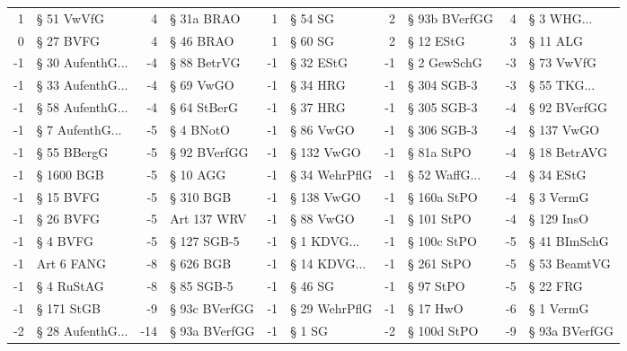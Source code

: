 \begin{tabular}{rlrlrlrlrl}
         1 &         § 51 VwVfG &          4 &    § 31a BRAO &           1 &        § 54 SG &          2 &   § 93b BVerfGG &          4 &  § 3 WHG... \\
         0 &          § 27 BVFG &          4 &     § 46 BRAO &           1 &        § 60 SG &          2 &       § 12 EStG &          3 &      § 11 ALG \\
        -1 & § 30 AufenthG... &         -4 &   § 88 BetrVG &          -1 &      § 32 EStG &         -1 &     § 2 GewSchG &         -3 &    § 73 VwVfG \\
        -1 & § 33 AufenthG... &         -4 &     § 69 VwGO &          -1 &       § 34 HRG &         -1 &     § 304 SGB-3 &         -3 & § 55 TKG... \\
        -1 & § 58 AufenthG... &         -4 &   § 64 StBerG &          -1 &       § 37 HRG &         -1 &     § 305 SGB-3 &         -4 &  § 92 BVerfGG \\
        -1 &  § 7 AufenthG... &         -5 &     § 4 BNotO &          -1 &      § 86 VwGO &         -1 &     § 306 SGB-3 &         -4 &    § 137 VwGO \\
        -1 &        § 55 BBergG &         -5 &  § 92 BVerfGG &          -1 &     § 132 VwGO &         -1 &      § 81a StPO &         -4 &  § 18 BetrAVG \\
        -1 &         § 1600 BGB &         -5 &      § 10 AGG &          -1 &  § 34 WehrPflG &         -1 & § 52 WaffG... &         -4 &     § 34 EStG \\
        -1 &          § 15 BVFG &         -5 &     § 310 BGB &          -1 &     § 138 VwGO &         -1 &     § 160a StPO &         -4 &     § 3 VermG \\
        -1 &          § 26 BVFG &         -5 &   Art 137 WRV &          -1 &      § 88 VwGO &         -1 &      § 101 StPO &         -4 &    § 129 InsO \\
        -1 &           § 4 BVFG &         -5 &   § 127 SGB-5 &          -1 &  § 1 KDVG... &         -1 &     § 100c StPO &         -5 &  § 41 BImSchG \\
        -1 &         Art 6 FANG &         -8 &     § 626 BGB &          -1 & § 14 KDVG... &         -1 &      § 261 StPO &         -5 &  § 53 BeamtVG \\
        -1 &         § 4 RuStAG &         -8 &    § 85 SGB-5 &          -1 &        § 46 SG &         -1 &       § 97 StPO &         -5 &      § 22 FRG \\
        -1 &         § 171 StGB &         -9 & § 93c BVerfGG &          -1 &  § 29 WehrPflG &         -1 &        § 17 HwO &         -6 &     § 1 VermG \\
        -2 & § 28 AufenthG... &        -14 & § 93a BVerfGG &          -1 &         § 1 SG &         -2 &     § 100d StPO &         -9 & § 93a BVerfGG \\
\bottomrule
\end{tabular}

